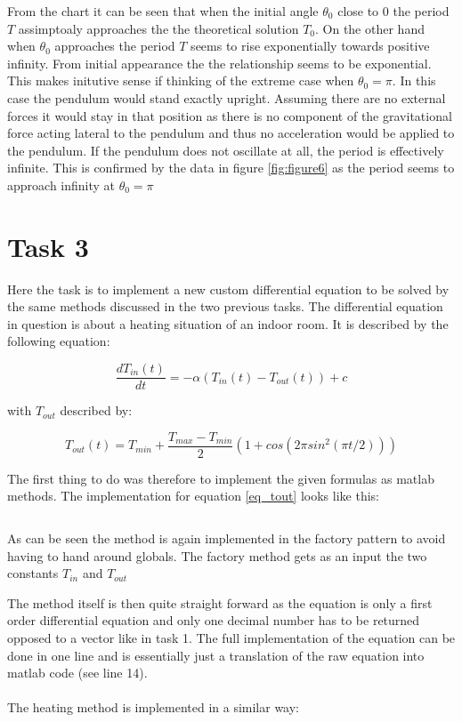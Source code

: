 \documentclass[14pt]{article}
\begin{document}
From the chart it can be seen that when the initial angle $\theta_0$ close to 0 the period $T$ assimptoaly approaches
the the theoretical solution $T_0$. On the other hand when $\theta_0$ approaches the period $T$ seems to rise exponentially
towards positive infinity. From initial appearance the the relationship seems to be exponential. This makes initutive sense if
thinking of the extreme case when $\theta_0 = \pi$. In this case the pendulum would stand exactly upright. Assuming there are
no external forces it would stay in that position as there is no component of the gravitational force acting lateral to the pendulum
and thus no acceleration would be applied to the pendulum. If the pendulum does not oscillate at all, the period is effectively infinite.
This is confirmed by the data in figure \ref{fig:figure6} as the period seems to approach infinity at $\theta_0 = \pi$

\section{Task 3}

Here the task is to implement a new custom differential equation to be solved by the same methods discussed in the two
previous tasks. The differential equation in question is about a heating situation of an indoor room. It is
described by the following equation:

\begin{equation}\label{eq_heating}
  \frac{d T_{in}(t)}{dt} = - \alpha(T_{in}(t) - T_{out}(t)) + c
\end{equation}

with $ T_{out} $ described by:

\begin{equation}\label{eq_tout}
  T_{out}(t) = T_{min} + \frac{T_{max} - T_{min}}{2}(1 + cos(2 \pi sin^2(\pi t/2)))
\end{equation}

The first thing to do was therefore to implement the given formulas as matlab methods. The implementation for
equation \ref{eq_tout} looks like this:

\inputminted[linenos]{octave}{./matlab/make_Tout.m}

As can be seen the method is again implemented in the factory pattern to avoid having to hand around globals.
The factory method gets as an input the two constants $T_{in}$ and $T_{out}$

The method itself is then quite straight forward as the equation is only a first order differential equation and
only one decimal number has to be returned opposed to a vector like in task 1. The full implementation of the 
equation can be done in one line and is essentially just a translation of the raw equation into matlab code (see line 14).\\
\\
The heating method is implemented in a similar way:
\end{document}
